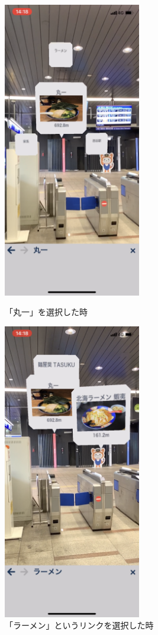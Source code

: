 \begin{figure}[h]
  \begin{minipage}{0.5\hsize}
    \centering
    \includegraphics[width=60mm]{images/nishiya_maruichi_ar.png}
    \caption{「丸一」を選択した時} \label{fig:nishiya_maruichi_ar}
  \end{minipage}
  \begin{minipage}{0.5\hsize}
    \centering
    \includegraphics[width=60mm]{images/nishiya_ramen_ar.png}
    \caption{「ラーメン」というリンクを選択した時} \label{fig:nishiya_ramen_ar}
  \end{minipage}
\end{figure}

